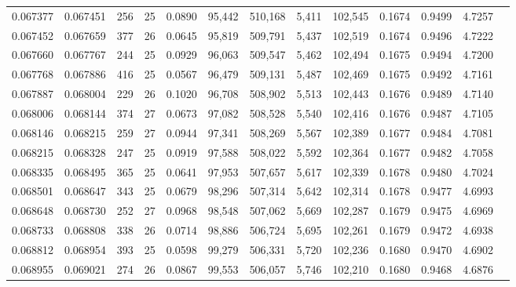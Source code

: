 \begin{tabular}{rrrrrrrrrrrrr}
0.067377 & 0.067451 & 256 &  25 &                                     0.0890 &  95,442 & 510,168 &   5,411 & 102,545 & 0.1674 & 0.9499 & 4.7257 \\
0.067452 & 0.067659 & 377 &  26 &                                     0.0645 &  95,819 & 509,791 &   5,437 & 102,519 & 0.1674 & 0.9496 & 4.7222 \\
0.067660 & 0.067767 & 244 &  25 &                                     0.0929 &  96,063 & 509,547 &   5,462 & 102,494 & 0.1675 & 0.9494 & 4.7200 \\
0.067768 & 0.067886 & 416 &  25 &                                     0.0567 &  96,479 & 509,131 &   5,487 & 102,469 & 0.1675 & 0.9492 & 4.7161 \\
0.067887 & 0.068004 & 229 &  26 &                                     0.1020 &  96,708 & 508,902 &   5,513 & 102,443 & 0.1676 & 0.9489 & 4.7140 \\
0.068006 & 0.068144 & 374 &  27 &                                     0.0673 &  97,082 & 508,528 &   5,540 & 102,416 & 0.1676 & 0.9487 & 4.7105 \\
0.068146 & 0.068215 & 259 &  27 &                                     0.0944 &  97,341 & 508,269 &   5,567 & 102,389 & 0.1677 & 0.9484 & 4.7081 \\
0.068215 & 0.068328 & 247 &  25 &                                     0.0919 &  97,588 & 508,022 &   5,592 & 102,364 & 0.1677 & 0.9482 & 4.7058 \\
0.068335 & 0.068495 & 365 &  25 &                                     0.0641 &  97,953 & 507,657 &   5,617 & 102,339 & 0.1678 & 0.9480 & 4.7024 \\
0.068501 & 0.068647 & 343 &  25 &                                     0.0679 &  98,296 & 507,314 &   5,642 & 102,314 & 0.1678 & 0.9477 & 4.6993 \\
0.068648 & 0.068730 & 252 &  27 &                                     0.0968 &  98,548 & 507,062 &   5,669 & 102,287 & 0.1679 & 0.9475 & 4.6969 \\
0.068733 & 0.068808 & 338 &  26 &                                     0.0714 &  98,886 & 506,724 &   5,695 & 102,261 & 0.1679 & 0.9472 & 4.6938 \\
0.068812 & 0.068954 & 393 &  25 &                                     0.0598 &  99,279 & 506,331 &   5,720 & 102,236 & 0.1680 & 0.9470 & 4.6902 \\
0.068955 & 0.069021 & 274 &  26 &                                     0.0867 &  99,553 & 506,057 &   5,746 & 102,210 & 0.1680 & 0.9468 & 4.6876 \\

\end{tabular}
